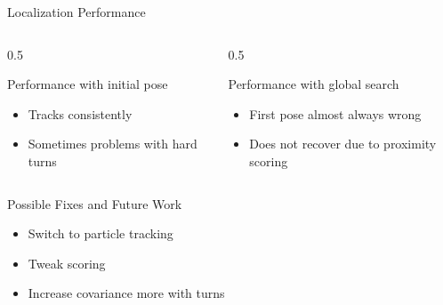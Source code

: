 \documentclass[aspectratio=169, 11pt]{beamer}
\begin{document}
\begin{frame}{Localization Performance}
  \begin{columns}[T]
    \begin{column}{0.5\textwidth}
      \begin{block}{Performance with initial pose}
          \begin{itemize}
            \item Tracks consistently
            \item Sometimes problems with hard turns
          \end{itemize}
      \end{block}
    \end{column}
    
    \begin{column}{0.5\textwidth}
      \begin{block}{Performance with global search}
          \begin{itemize}
            \item First pose almost always wrong
            \item Does not recover due to proximity scoring
          \end{itemize}
      \end{block}
    \end{column}
  \end{columns}
  \begin{block}{Possible Fixes and Future Work}
    \begin{itemize}
        \item Switch to particle tracking
        \item Tweak scoring
        \item Increase covariance more with turns
    \end{itemize}
  \end{block}
\end{frame}
\end{document}
